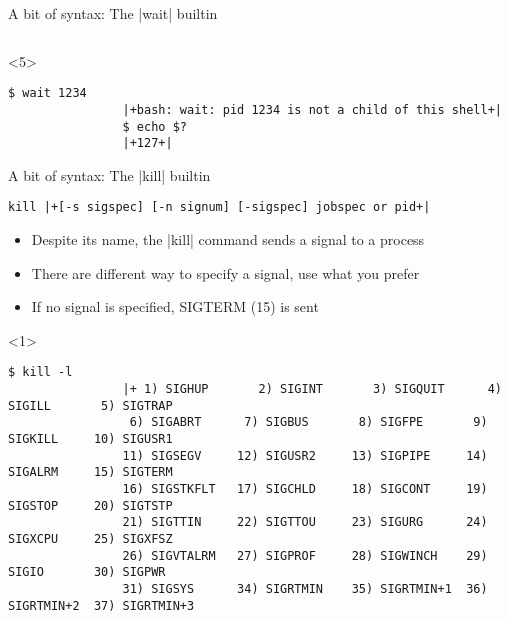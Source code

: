 \begin{frame}[fragile]{A bit of syntax: The \bash|wait| builtin}
\begin{overlayarea}{\textwidth}{0.7\textheight}
\begin{onlyenv}
\begin{lstlisting}[style=MyBash, numbers=none, aboveskip=1mm]
            \end{lstlisting}
        \end{onlyenv}
        \begin{onlyenv}<5>
            \begin{lstlisting}[style=MyBash, numbers=none, aboveskip=3mm]
                $ wait 1234
                |+bash: wait: pid 1234 is not a child of this shell+|
                $ echo $?
                |+127+|
            \end{lstlisting}
        \end{onlyenv}
    \end{overlayarea}
\end{frame}
\begin{frame}[fragile]{A bit of syntax: The \bash|kill| builtin}
    \vspace{-1mm}
    \begin{overlayarea}{\textwidth}{0.7\textheight}
        \begin{lstlisting}[style=MyBash, numbers=none, belowskip=-6mm]
            kill |+[-s sigspec] [-n signum] [-sigspec] jobspec or pid+|
        \end{lstlisting}
        \begin{itemize}
            \item Despite its name, the \bash|kill| command sends a signal to a process
            \item There are different way to specify a signal, use what you prefer
            \item If no signal is specified, SIGTERM (15) is sent
        \end{itemize}
        \begin{onlyenv}<1>
            \begin{lstlisting}[style=MyBash, style=smaller, numbers=none, xleftmargin=1mm]
                $ kill -l
                |+ 1) SIGHUP       2) SIGINT       3) SIGQUIT      4) SIGILL       5) SIGTRAP
                 6) SIGABRT      7) SIGBUS       8) SIGFPE       9) SIGKILL     10) SIGUSR1
                11) SIGSEGV     12) SIGUSR2     13) SIGPIPE     14) SIGALRM     15) SIGTERM
                16) SIGSTKFLT   17) SIGCHLD     18) SIGCONT     19) SIGSTOP     20) SIGTSTP
                21) SIGTTIN     22) SIGTTOU     23) SIGURG      24) SIGXCPU     25) SIGXFSZ
                26) SIGVTALRM   27) SIGPROF     28) SIGWINCH    29) SIGIO       30) SIGPWR
                31) SIGSYS      34) SIGRTMIN    35) SIGRTMIN+1  36) SIGRTMIN+2  37) SIGRTMIN+3

\end{lstlisting}
\end{onlyenv}
\end{overlayarea}
\end{frame}
